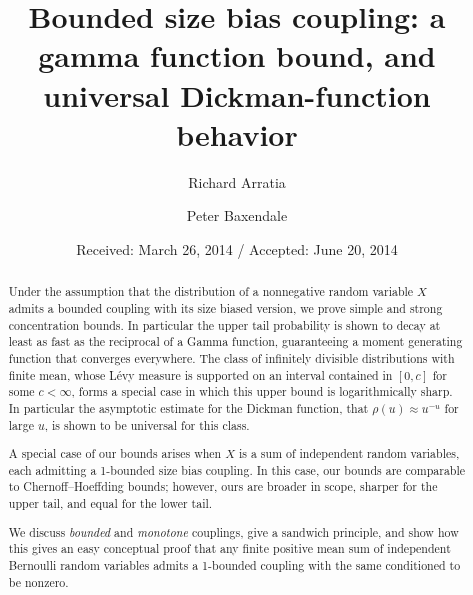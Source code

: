 \documentclass[smallextended,envcountsect]{svjour3}
\begin{document}
\title{Bounded size bias coupling: a gamma function bound, and universal Dickman-function behavior
}


\author{Richard Arratia         \and
        Peter Baxendale 
}


\date{Received: March 26, 2014 / Accepted: June 20, 2014 }

\maketitle

\begin{abstract}
Under the assumption that the distribution of a nonnegative random variable $X$ admits a bounded coupling with its
size biased version,  we prove  simple and strong concentration bounds.
In particular the upper tail probability is shown to  decay at least as fast as
the reciprocal of a Gamma function,
 guaranteeing a moment generating function that converges everywhere.  The class of infinitely divisible distributions with finite mean, whose L\'evy measure is supported on an interval contained in $[0,c]$ for some $c < \infty$, forms a special case in which this upper bound is logarithmically sharp. In particular the asymptotic estimate for the Dickman function, that $\rho(u) \approx u^{-u}$ for large $u$, is shown to be universal for this class.

A special case of our bounds arises when $X$ is a sum of independent random variables, each admitting a 1-bounded size bias coupling.  In this case, our bounds are comparable to Chernoff--Hoeffding bounds; however,
ours are broader in scope, sharper for the upper tail, and equal for the lower tail.

We discuss \emph{bounded} and \emph{monotone} couplings, give a sandwich principle, and show how this gives an easy conceptual proof that any finite positive mean
sum of independent Bernoulli random variables
admits a 1-bounded coupling with the same
conditioned to be nonzero.

\end{abstract}
\end{document}

